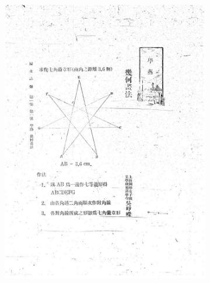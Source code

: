 \documentclass{beamer}
\begin{document}
\begin{frame}
\begin{figure}[htbp]
\begin{subfigure}[b]{0.23\linewidth}
            \includegraphics[height=1.3\linewidth]{./figures/fnzz3}
        \end{subfigure}
        \hfill
        \begin{subfigure}[b]{0.23\linewidth}

\end{subfigure}
\end{figure}
\end{frame}
\end{document}
